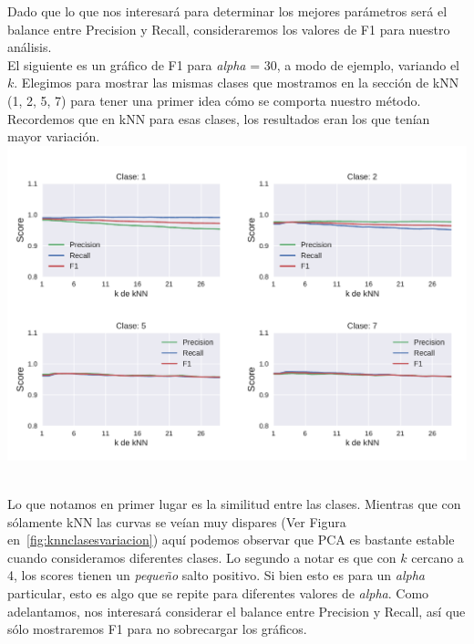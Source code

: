 Dado que lo que nos interesará para determinar los mejores parámetros será el balance entre Precision y Recall, consideraremos los valores de F1 para nuestro análisis.  \\

El siguiente es un gráfico de F1 para \textit{alpha} = 30, a modo de ejemplo, variando el $k$. Elegimos para mostrar las mismas clases que mostramos en la sección de kNN (1, 2, 5, 7) para tener una primer idea cómo se comporta nuestro método. Recordemos que en kNN para esas clases, los resultados eran los que tenían mayor variación. \\

{\centering
    \includegraphics[scale=0.65]{informe/imagenes/pca/variacionKClases1257PresRecall.pdf} \\
}
$ $\newline

Lo que notamos en primer lugar es la similitud entre las clases. Mientras que con sólamente kNN las curvas se veían muy dispares (Ver Figura en~\ref{fig:knnclasesvariacion}) aquí podemos observar que PCA es bastante estable cuando consideramos diferentes clases. Lo segundo a notar es que con $k$ cercano a 4, los scores tienen un \textit{pequeño} salto positivo. Si bien esto es para un \textit{alpha} particular, esto es algo que se repite para diferentes valores de \textit{alpha}. Como adelantamos, nos interesará considerar el balance entre Precision y Recall, así que sólo mostraremos F1 para no sobrecargar los gráficos. \\

